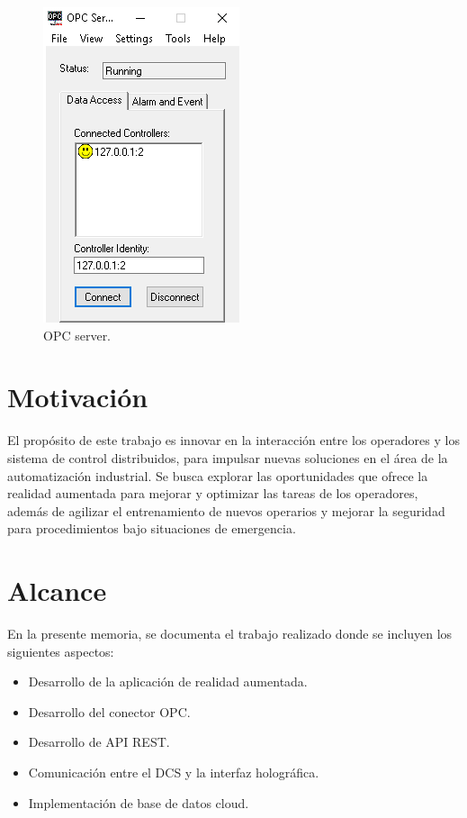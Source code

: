 \begin{figure}[htpb]
	\centering
	\includegraphics[scale=.5]{./Figures/c2.png}
	\caption{OPC server\protect\footnotemark.}
	\label{fig:c2}
\end{figure}


\section{Motivación}
El propósito de este trabajo es innovar en la interacción entre los operadores y los sistema de control distribuidos, para impulsar nuevas soluciones en el área de la automatización industrial. Se busca explorar las oportunidades que ofrece la realidad aumentada para mejorar y optimizar las tareas de los operadores, además de agilizar el entrenamiento de nuevos operarios y mejorar la seguridad para procedimientos bajo situaciones de emergencia.


\section{Alcance}

En la presente memoria, se documenta el trabajo realizado donde se incluyen los siguientes aspectos:

\begin{itemize}	
\item Desarrollo de la aplicación de realidad aumentada.
\item Desarrollo del conector OPC.
\item Desarrollo de API REST.
\item Comunicación entre el DCS y la interfaz holográfica.
\item Implementación de base de datos cloud.
\end{itemize}